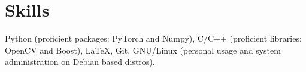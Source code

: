 \section{\mysidestyle \textcolor{olgray}{Skills}}
Python (proficient packages: PyTorch and Numpy), C/C++ (proficient libraries: OpenCV and Boost), \LaTeX, Git, GNU/Linux (personal usage and system administration on Debian based distros).

\ifx\researchtyperesume\undefined
\else
\vspace{1mm}
\fi

